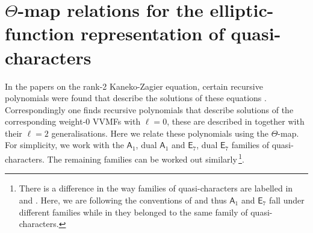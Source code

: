 \documentclass[11pt]{article}
\newcommand\mA{{\mathsf A}}
\newcommand\mE{{\mathsf E}}
\begin{document}
\section{$\Theta$-map relations for the elliptic-function
representation of quasi-characters}\label{app:theta_Pn}

In the papers on the rank-2 Kaneko-Zagier equation, certain recursive polynomials were found that describe the solutions of these equations \cite{KK, Kaneko:On, Kaneko:2013uga}. Correspondingly one finds recursive polynomials that describe solutions of the corresponding weight-0 VVMFs with $\ell=0$, these are described in \cite{Chandra:2018pjq} together with their $\ell=2$ generalisations. Here we relate these polynomials using the $\Theta$-map. For simplicity, we work with the $\mA_{1}$, dual $\mA_1$ and $\mE_{7}$, dual $\mE_7$ families of quasi-characters. The remaining families can be worked out similarly\,\footnote{There is a difference in the way families of quasi-characters are labelled in \cite{Das:2025gto} and \cite{Chandra:2018pjq}. Here, we are following the conventions of \cite{Das:2025gto} and thus $\mA_1$ and $\mE_7$ fall under different families while in \cite{Chandra:2018pjq} they belonged to the same family of quasi-characters.}.
\end{document}
